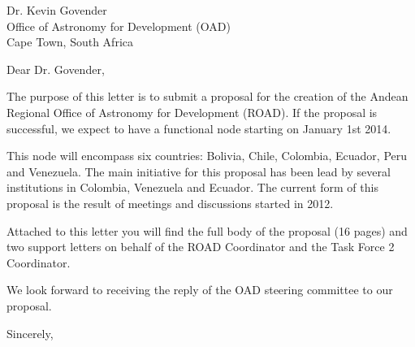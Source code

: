 \documentclass[a4paper,DIN]{scrlttr2}
\begin{document}
\begin{letter}{%
Dr. Kevin Govender\\
Office of Astronomy for Development (OAD)\\
Cape Town, South Africa
}

\opening{Dear Dr. Govender,}


The purpose of this letter is to submit a proposal for the creation of
the Andean Regional Office of Astronomy for Development (ROAD). If the
proposal is successful, we expect to have a functional node starting
on January 1st 2014. 

This node will encompass six countries: Bolivia, Chile, Colombia,
Ecuador, Peru and Venezuela. The main initiative for this proposal has
been lead by several institutions in Colombia, Venezuela and
Ecuador. The current form of this proposal is the result of meetings
and discussions started in 2012. 

Attached to this letter you will find the full body of the proposal
(16 pages) and two support letters on behalf of the ROAD Coordinator and the
Task Force 2 Coordinator.

We look forward to receiving the reply of the OAD steering committee
to our proposal.


\closing{Sincerely,}

\vspace{-1cm}
\end{letter}
\end{document}
